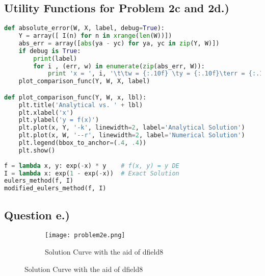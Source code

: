 \documentclass{article}
\begin{document}
\subsection*{Utility Functions for Problem 2c and 2d.)}
\begin{lstlisting}[language=Python]
def absolute_error(W, X, label, debug=True):
    Y = array([ I(n) for n in xrange(len(W))])
    abs_err = array([abs(ya - yc) for ya, yc in zip(Y, W)])
    if debug is True:
        print(label)
        for i , (err, w) in enumerate(zip(abs_err, W)):
            print 'x = ', i, '\t\tw = {:.10f} \ty = {:.10f}\terr = {:.10f}'.format(w, Y[i], abs_err[i])
    plot_comparison_func(Y, W, X, label)

def plot_comparison_func(Y, W, x, lbl):
    plt.title('Analytical vs. ' + lbl)
    plt.xlabel('x')
    plt.ylabel('y = f(x)')
    plt.plot(x, Y, '-k', linewidth=2, label='Analytical Solution')
    plt.plot(x, W, '--r', linewidth=2, label='Numerical Solution')
    plt.legend(bbox_to_anchor=(.4, .4))
    plt.show()
    
f = lambda x, y: exp(-x) * y    # f(x, y) = y DE
I = lambda x: exp(1 - exp(-x))  # Exact Solution
eulers_method(f, I)
modified_eulers_method(f, I)
\end{lstlisting}

\pagebreak


\subsection*{Question e.)}
\begin{figure}[h!]
  \centering
  \begin{subfigure}{\linewidth}
    \texttt{[image: problem2e.png]}
    \caption{Solution Curve with the aid of dfield8}
  \end{subfigure}
\end{figure}
\end{document}
